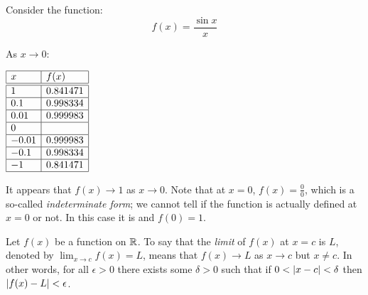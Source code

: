 \documentclass[letterpaper,12pt,fleqn]{article}
\newcommand{\e}{\epsilon}
\renewcommand{\d}{\delta}
\begin{document}
\begin{example}
  Consider the function:
  \[f(x)=\frac{\sin x}{x}\]

  \bigskip

  \begin{center}
  \end{center}

  As \(x\to0\):

  \begin{center}
    \(\begin{array}{|l|l|}
    \hline
    x & f(x) \\
    \hline
    \hline
    1 & 0.841471 \\
    \hline
    0.1 & 0.998334 \\
    \hline
    0.01 & 0.999983 \\
    \hline
    0 & \\
    \hline
    -0.01 & 0.999983 \\
    \hline
    -0.1 & 0.998334 \\
    \hline
    -1 & 0.841471 \\
    \hline
    \end{array}\)
  \end{center}

  \bigskip

  It appears that \(f(x)\to1\) as \(x\to0\).  Note that at \(x=0\), \(f(x)=\frac{0}{0}\), which is a so-called
  \emph{indeterminate form}; we cannot tell if the function is actually defined at \(x=0\) or not.  In this case
  it is and \(f(0)=1\).
\end{example}

\begin{definition}
  Let \(f(x)\) be a function on \(\mathbb{R}\).  To say that the \emph{limit} of \(f(x)\) at \(x=c\) is \(L\), denoted by
  \(\displaystyle\lim_{x\to c}f(x)=L\), means that \(f(x)\to L\) as \(x\to c\) but \(x\ne c\).  In other words, for
  all \(\e>0\) there exists some \(\d>0\) such that if \(0<\abs{x-c}<\d\) then \(\abs{f(x)-L}<\e\).
\end{definition}
\end{document}
